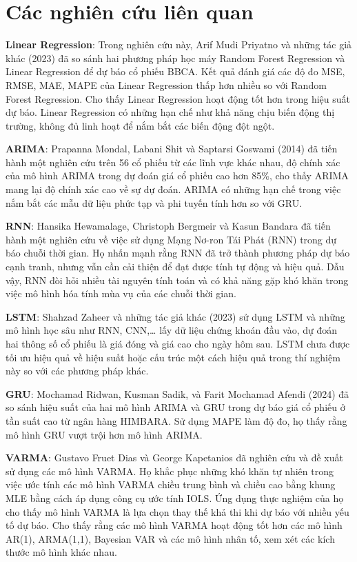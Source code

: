 \section{Các nghiên cứu liên quan}
\textbf{Linear Regression}: Trong nghiên cứu này, Arif Mudi Priyatno và những tác giả khác \cite{lr} (2023) đã so sánh hai phương pháp học máy Random Forest Regression và Linear Regression để dự báo cổ phiếu BBCA. Kết quả đánh giá các độ đo MSE, RMSE, MAE, MAPE của Linear Regression thấp hơn nhiều so với Random Forest Regression. Cho thấy Linear Regression hoạt động tốt hơn trong hiệu suất dự báo.
Linear Regression có những hạn chế như khả năng chịu biến động thị trường, không đủ linh hoạt để nắm bắt các biến động đột ngột.
\par
\textbf{ARIMA}: Prapanna Mondal, Labani Shit và Saptarsi Goswami \cite{arima} (2014) đã tiến hành một nghiên cứu trên 56 cổ phiếu từ các lĩnh vực khác nhau, độ chính xác của mô hình ARIMA trong dự đoán giá cổ phiếu cao hơn 85\%, cho thấy ARIMA mang lại độ chính xác cao về sự dự đoán.
ARIMA có những hạn chế trong việc nắm bắt các mẫu dữ liệu phức tạp và phi tuyến tính hơn so với GRU.
\par
\textbf{RNN}: Hansika Hewamalage, Christoph Bergmeir và Kasun Bandara đã tiến hành một nghiên cứu về việc sử dụng Mạng Nơ-ron Tái Phát (RNN) \cite{rnn} trong dự báo chuỗi thời gian. Họ nhấn mạnh rằng RNN đã trở thành phương pháp dự báo cạnh tranh, nhưng vẫn cần cải thiện để đạt được tính tự động và hiệu quả. 
Dẫu vậy, RNN đòi hỏi nhiều tài nguyên tính toán và có khả năng gặp khó khăn trong việc mô hình hóa tính mùa vụ của các chuỗi thời gian.
\par
\textbf{LSTM}: Shahzad Zaheer và những tác giả khác \cite{lstm} (2023) sử dụng LSTM và những mô hình học sâu như RNN, CNN,… lấy dữ liệu chứng khoán đầu vào, dự đoán hai thông số cổ phiếu là giá đóng và giá cao cho ngày hôm sau.
LSTM chưa được tối ưu hiệu quả về hiệu suất hoặc cấu trúc một cách hiệu quả trong thí nghiệm này so với các phương pháp khác.
\par
\textbf{GRU}: Mochamad Ridwan, Kusman Sadik, và Farit Mochamad Afendi \cite{gru} (2024) đã so sánh hiệu suất của hai mô hình ARIMA và GRU trong dự báo giá cổ phiếu ở tần suất cao từ ngân hàng HIMBARA. Sử dụng MAPE làm độ đo, họ thấy rằng mô hình GRU vượt trội hơn mô hình ARIMA.
\par
\textbf{VARMA}: Gustavo Fruet Dias và George Kapetanios \cite{varma} đã nghiên cứu và đề xuất sử dụng các mô hình VARMA. Họ khắc phục những khó khăn tự nhiên trong việc ước tính các mô hình VARMA chiều trung bình và chiều cao bằng khung MLE bằng cách áp dụng công cụ ước tính IOLS. Ứng dụng thực nghiệm của họ cho thấy mô hình VARMA là lựa chọn thay thế khả thi khi dự báo với nhiều yếu tố dự báo. Cho thấy rằng các mô hình VARMA hoạt động tốt hơn các mô hình AR(1), ARMA(1,1), Bayesian VAR và các mô hình nhân tố, xem xét các kích thước mô hình khác nhau.

